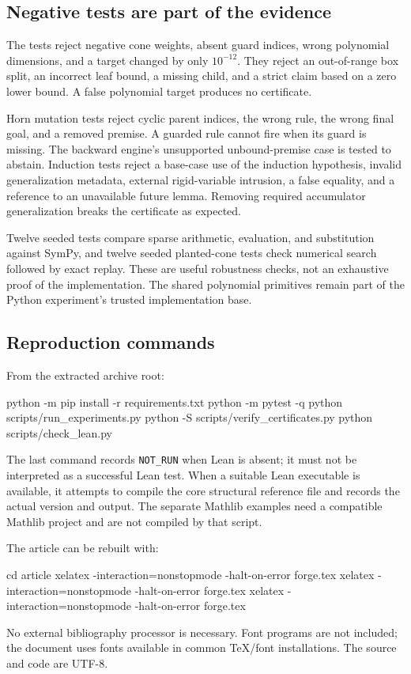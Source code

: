 \documentclass[11pt,a4paper]{article}
\newcommand{\code}[1]{\texttt{#1}}
\begin{document}
\subsection{Negative tests are part of the evidence}
The tests reject negative cone weights, absent guard indices, wrong polynomial
dimensions, and a target changed by only $10^{-12}$. They reject an out-of-range
box split, an incorrect leaf bound, a missing child, and a strict claim based
on a zero lower bound. A false polynomial target produces no certificate.

Horn mutation tests reject cyclic parent indices, the wrong rule, the wrong
final goal, and a removed premise. A guarded rule cannot fire when its guard is
missing. The backward engine's unsupported unbound-premise case is tested to
abstain. Induction tests reject a base-case use of the induction hypothesis,
invalid generalization metadata, external rigid-variable intrusion, a false
equality, and a reference to an unavailable future lemma. Removing required
accumulator generalization breaks the certificate as expected.

Twelve seeded tests compare sparse arithmetic, evaluation, and substitution
against SymPy, and twelve seeded planted-cone tests check numerical search
followed by exact replay. These are useful robustness checks, not an exhaustive
proof of the implementation. The shared polynomial primitives remain part of
the Python experiment's trusted implementation base.

\subsection{Reproduction commands}
From the extracted archive root:
\begin{Code}
python -m pip install -r requirements.txt
python -m pytest -q
python scripts/run_experiments.py
python -S scripts/verify_certificates.py
python scripts/check_lean.py
\end{Code}
The last command records \code{NOT\_RUN} when Lean is absent; it must not be
interpreted as a successful Lean test. When a suitable Lean executable is
available, it attempts to compile the core structural reference file and records
the actual version and output. The separate Mathlib examples need a compatible
Mathlib project and are not compiled by that script.

The article can be rebuilt with:
\begin{Code}
cd article
xelatex -interaction=nonstopmode -halt-on-error forge.tex
xelatex -interaction=nonstopmode -halt-on-error forge.tex
xelatex -interaction=nonstopmode -halt-on-error forge.tex
\end{Code}
No external bibliography processor is necessary. Font programs are not included;
the document uses fonts available in common TeX/font installations. The source
and code are UTF-8.
\end{document}
